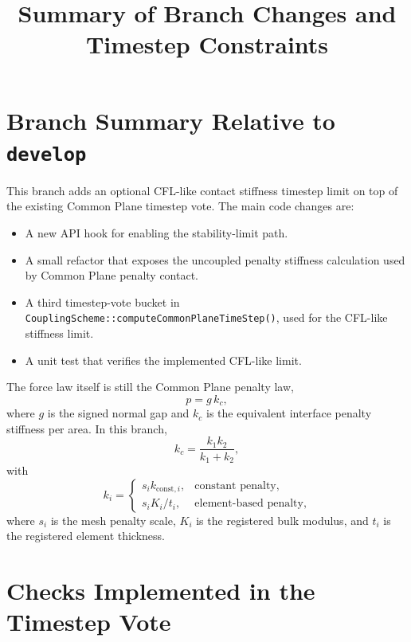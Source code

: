 \documentclass[11pt]{article}
\title{Summary of Branch Changes and Timestep Constraints}
\author{}
\date{}
\begin{document}
\maketitle

\section{Branch Summary Relative to \texttt{develop}}

This branch adds an optional CFL-like contact stiffness timestep limit on top of the existing Common Plane timestep vote. The main code changes are:

\begin{itemize}[leftmargin=*]
\item A new API hook for enabling the stability-limit path.
\item A small refactor that exposes the uncoupled penalty stiffness calculation used by Common Plane penalty contact.
\item A third timestep-vote bucket in \texttt{CouplingScheme::computeCommonPlaneTimeStep()}, used for the CFL-like stiffness limit.
\item A unit test that verifies the implemented CFL-like limit.
\end{itemize}

The force law itself is still the Common Plane penalty law,
\begin{equation}
  p = g \, k_c,
\end{equation}
where $g$ is the signed normal gap and $k_c$ is the equivalent interface penalty stiffness per area. In this branch,
\begin{equation}
  k_c = \frac{k_1 k_2}{k_1 + k_2},
\end{equation}
with
\begin{equation}
  k_i =
  \begin{cases}
    s_i k_{\mathrm{const},i}, & \text{constant penalty}, \\
    s_i K_i / t_i, & \text{element-based penalty},
  \end{cases}
\end{equation}
where $s_i$ is the mesh penalty scale, $K_i$ is the registered bulk modulus, and $t_i$ is the registered element thickness.

\section{Checks Implemented in the Timestep Vote}
\end{document}
